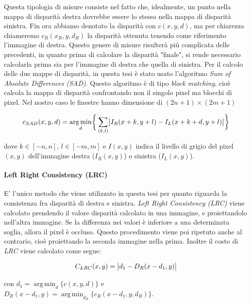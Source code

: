\documentclass[12pt]{report}
\DeclarePairedDelimiter{\abs}{\lvert}{\rvert}    %
\DeclareMathOperator*{\argmin}{arg\,min} %
\begin{document}
			Questa tipologia di misure consiste nel fatto che, idealmente, un punto nella mappa di disparità destra dovrebbe essere lo stesso nella mappa di disparità sinistra. Fin ora abbiamo denotato la disparità con $c(x,y,d)$, ma per chiarezza chiameremo $c_{R}(x_{R},y,d_{R})$ la disparità ottenuta tenendo come riferimento l'immagine di destra. Questo genere di misure risulterà più complicata delle precedenti, in quanto prima di calcolare la disparità "finale", si rende necessario calcolarla prima sia per l'immagine di destra che quella di sinistra. Per il calcolo delle due mappe di disparità, in questa tesi è stato usato l'algoritmo \textit{Sum of Absolute Differences (SAD)}. Questo algoritmo è di tipo \textit{block matching}, cioè calcola la mappa di disparità confrontando non il singolo pixel ma blocchi di pixel. Nel nostro caso le finestre hanno dimensione di $(2n+1)\times(2m+1)$
		
			\begin{equation}
				c_{SAD}(x,y,d)=\argmin_{d}\biggr\{\sum_{(k,l)}\abs[\big]{I_{R}(x+k,y+l) - I_{L}(x+k+d,y+l)}\biggr\}
				\label{eq:SAD}
			\end{equation}		
			
			\noindent dove $k\in[-n,n]$, $l\in[-m,m]$ e $I(x,y)$ indica il livello di grigio del pixel $(x,y)$ dell'immagine destra ($I_{R}(x,y)$) o sinistra ($I_{L}(x,y)$). 
		
		
			\paragraph{Left Right Consistency (LRC)}
			\label{par:LRC}
			
				E' l'unico metodo che viene utilizzato in questa tesi per quanto riguarda la consistenza fra disparità di destra e sinistra.
				\textit{Left Right Consistency (LRC)} viene calcolato prendendo il valore disparità calcolato in una immagine, e proiettandolo nell'altra immagine. Se la differenza nei valori è inferiore a una determinata soglia, allora il pixel è occluso. Questo procedimento viene poi ripetuto anche al contrario, cioè proiettando la seconda immagine nella prima. Inoltre il costo di \textit{LRC} viene calcolato come segue:
				
				\begin{equation}
					C_{LRC}(x,y)=\abs[\big]{d_{1}-D_{R}(x-d_{1},y)}
					\label{eq:LRC}
				\end{equation}	
				
				\noindent con $d_{1}=\argmin_{d}\bigr\{c(x,y,d)\bigr\}$ e $D_{R}(x-d_{1},y)=\argmin_{d_{R}}\bigr\{c_{R}(x-d_{1},y,d_{R})\bigr\}$.
				
\end{document}

